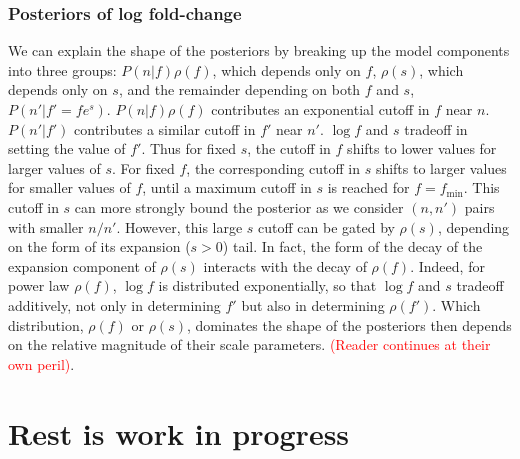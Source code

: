 \documentclass[letterpaper,english,prl,reprint,longbibliography]{revtex4-1} %
\begin{document}
\subsubsection*{Posteriors of log fold-change}

We can explain the shape of the posteriors by breaking up the model components into three groups: $P(n|f)\rho(f)$, which depends only on $f$, $\rho(s)$, which depends only on $s$, and the remainder depending on both $f$ and $s$, $P(n'|f'=fe^s)$. 
$P(n|f)\rho(f)$ contributes an exponential cutoff in $f$ near $n$.
$P(n'|f')$ contributes a similar cutoff in $f'$ near $n'$. 
$\log f$ and $s$ tradeoff in setting the value of $f'$.
Thus for fixed $s$, the cutoff in $f$ shifts to lower values for larger values of $s$.
For fixed $f$, the corresponding cutoff in $s$ shifts to larger values for smaller values of $f$, until a maximum cutoff in $s$ is reached for $f=f_\textrm{min}$.
This cutoff in $s$ can more strongly bound the posterior as we consider $(n,n')$ pairs with smaller $n/n'$.
However, this large $s$ cutoff can be gated by $\rho(s)$, depending on the form of its expansion ($s>0$) tail. 
In fact, the form of the decay of the expansion component of $\rho(s)$ interacts with the decay of $\rho(f)$. 
Indeed, for power law $\rho(f)$, $\log f$ is distributed exponentially, so that $\log f$ and $s$ tradeoff additively, not only in determining $f'$ but also in determining $\rho(f')$.
Which distribution, $\rho(f)$ or $\rho(s)$, dominates the shape of the posteriors then depends on the relative magnitude of their scale parameters.
\textcolor{red}{(Reader continues at their own peril)}.
\section{Rest is work in progress}
	

\end{document}
